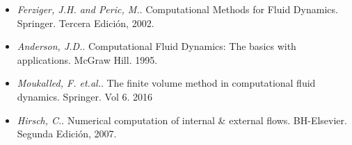 \documentclass[11pt,stdletter,orderfromtodate,sigleft,twoside]{report}
\begin{document}
\begin{itemize}

\item \textit{Ferziger, J.H. and Peric, M.}. Computational Methods for Fluid Dynamics.
Springer. Tercera Edición, 2002.
\item \textit{Anderson, J.D.}. Computational Fluid Dynamics: The basics with applications.
McGraw Hill. 1995.
\item \textit{Moukalled, F. et.al.}. The finite volume method in computational fluid
dynamics. Springer. Vol 6. 2016
\item \textit{Hirsch, C.}. Numerical computation of internal \& external flows.
BH-Elsevier. Segunda Edición, 2007.

\end{itemize}
\end{document}
